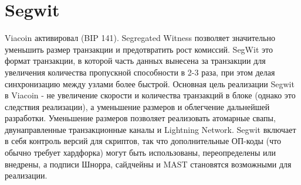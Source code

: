 \documentclass{article}
\begin{document}
\section{Segwit}\label{sec: Segwit}
Viacoin активировал \cite{segwit} (BIP 141). Segregated Witness позволяет
значительно уменьшить размер транзакции и предотвратить рост комиссий.
SegWit это формат транзакции, в которой часть данных вынесена за транзакции для
увеличения количества пропускной способности в 2-3 раза, при этом делая синхронизацию между
узлами более быстрой.
\newline \newline \noindent
Основная цель реализации Segwit в Viacoin - не увеличение скорости и количества
транзакций в блоке (однако это следствия реализации), а уменьшение размеров
 и облегчение дальнейшей разработки. Уменьшение размеров позволяет реализовать
 \cite{atomic} атомарные свапы, двунаправленные транзакционные каналы и Lightning Network.
\newline \newline \noindent
Segwit включает в себя контроль версий для скриптов, так что дополнительные ОП-коды
(что обычно требует хардфорка) могут быть использованы, переопределены или внедрены, а подписи Шнорра,
сайдчейны и MAST становятся возможными для реализации.
\end{document}
